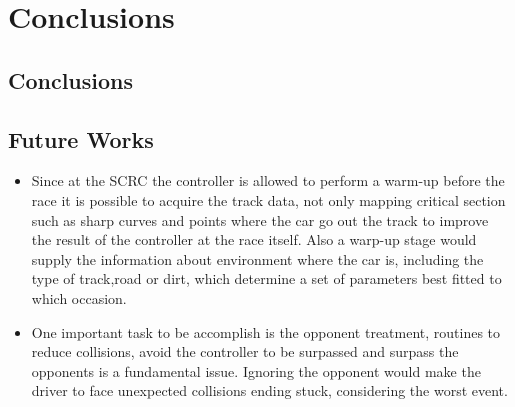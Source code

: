 \section{Conclusions} \label{sec:Conclusions}

	
\subsection{Conclusions} \label{subsec:Conclusions}


\subsection{Future Works} \label{subsec:Future}
	
	\begin{itemize}
		
		\item Since at the SCRC the controller is allowed to perform a warm-up before the race it is possible to acquire the track data, not only mapping critical section such as sharp curves and points where the car go out the track to improve the result of the controller at the race itself. Also a warp-up stage would supply the information about environment where the car is, including the type of track,road or dirt, which determine a set of parameters best fitted to which occasion. 
		
		\item One important task to be accomplish is the opponent treatment, routines to reduce collisions, avoid the controller to be surpassed and surpass the opponents is a fundamental issue. Ignoring the opponent would make the driver to face unexpected collisions ending stuck, considering the worst event.
		
	\end{itemize}
	
	
	
	